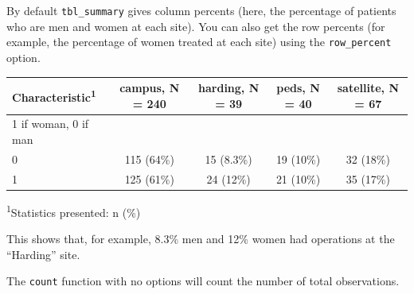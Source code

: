 \documentclass[]{book}
\newenvironment{Shaded}{\begin{snugshade}}{\end{snugshade}}
\newcommand{\CommentTok}[1]{\textcolor[rgb]{0.56,0.35,0.01}{\textit{#1}}}
\newcommand{\DataTypeTok}[1]{\textcolor[rgb]{0.13,0.29,0.53}{#1}}
\newcommand{\KeywordTok}[1]{\textcolor[rgb]{0.13,0.29,0.53}{\textbf{#1}}}
\newcommand{\NormalTok}[1]{#1}
\newcommand{\OperatorTok}[1]{\textcolor[rgb]{0.81,0.36,0.00}{\textbf{#1}}}
\newcommand{\OtherTok}[1]{\textcolor[rgb]{0.56,0.35,0.01}{#1}}
\newcommand{\StringTok}[1]{\textcolor[rgb]{0.31,0.60,0.02}{#1}}
\begin{document}
By default \texttt{tbl\_summary} gives column percents (here, the percentage of patients who are men and women at each site). You can also get the row percents (for example, the percentage of women treated at each site) using the \texttt{row\_percent} option.

\begin{Shaded}
\end{Shaded}

\captionsetup[table]{labelformat=empty,skip=1pt}
\begin{longtable}{lcccc}
\toprule
\textbf{Characteristic}\textsuperscript{1} & \textbf{campus}, N = 240 & \textbf{harding}, N = 39 & \textbf{peds}, N = 40 & \textbf{satellite}, N = 67 \\ 
\midrule
1 if woman, 0 if man &  &  &  &  \\ 
0 & 115 (64\%) & 15 (8.3\%) & 19 (10\%) & 32 (18\%) \\ 
1 & 125 (61\%) & 24 (12\%) & 21 (10\%) & 35 (17\%) \\ 
\bottomrule
\end{longtable}
\vspace{-5mm}
\begin{minipage}{\linewidth}
\textsuperscript{1}Statistics presented: n (\%) \\ 
\end{minipage}

This shows that, for example, 8.3\% men and 12\% women had operations at the ``Harding'' site.

The \texttt{count} function with no options will count the number of total observations.

\begin{Shaded}
\end{Shaded}
\end{document}

